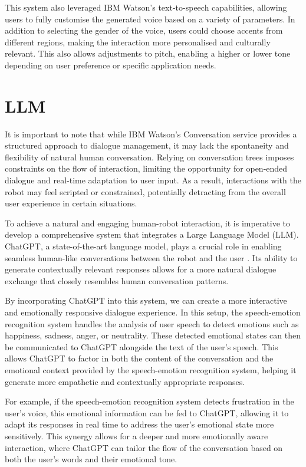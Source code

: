 This system also leveraged IBM Watson's text-to-speech capabilities, allowing users to fully customise the generated voice based on a variety of parameters. In addition to selecting the gender of the voice, users could choose accents from different regions, making the interaction more personalised and culturally relevant. This also allows adjustments to pitch, enabling a higher or lower tone depending on user preference or specific application needs.

\section{LLM}

It is important to note that while IBM Watson's Conversation service provides a structured approach to dialogue management, it may lack the spontaneity and flexibility of natural human conversation. Relying on conversation trees imposes constraints on the flow of interaction, limiting the opportunity for open-ended dialogue and real-time adaptation to user input. As a result, interactions with the robot may feel scripted or constrained, potentially detracting from the overall user experience in certain situations.

To achieve a natural and engaging human-robot interaction, it is imperative to develop a comprehensive system that integrates a Large Language Model (LLM). ChatGPT, a state-of-the-art language model, plays a crucial role in enabling seamless human-like conversations between the robot and the user \cite{chatgpt}. Its ability to generate contextually relevant responses allows for a more natural dialogue exchange that closely resembles human conversation patterns.

By incorporating ChatGPT into this system, we can create a more interactive and emotionally responsive dialogue experience. In this setup, the speech-emotion recognition system handles the analysis of user speech to detect emotions such as happiness, sadness, anger, or neutrality. These detected emotional states can then be communicated to ChatGPT alongside the text of the user's speech. This allows ChatGPT to factor in both the content of the conversation and the emotional context provided by the speech-emotion recognition system, helping it generate more empathetic and contextually appropriate responses.

For example, if the speech-emotion recognition system detects frustration in the user's voice, this emotional information can be fed to ChatGPT, allowing it to adapt its responses in real time to address the user’s emotional state more sensitively. This synergy allows for a deeper and more emotionally aware interaction, where ChatGPT can tailor the flow of the conversation based on both the user’s words and their emotional tone.


